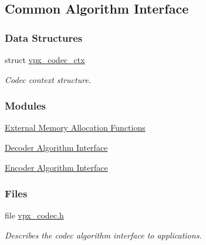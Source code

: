 \hypertarget{group__codec}{
\subsection{\-Common \-Algorithm \-Interface}
\label{group__codec}
}
\subsubsection*{\-Data \-Structures}
\begin{DoxyCompactItemize}
\item 
struct \hyperlink{structvpx__codec__ctx}{vpx\-\_\-codec\-\_\-ctx}
\begin{DoxyCompactList}\small\item\em \-Codec context structure. \end{DoxyCompactList}\end{DoxyCompactItemize}
\subsubsection*{\-Modules}
\begin{DoxyCompactItemize}
\item 
\hyperlink{group__cap__xma}{\-External Memory Allocation Functions}
\item 
\hyperlink{group__decoder}{\-Decoder Algorithm Interface}
\item 
\hyperlink{group__encoder}{\-Encoder Algorithm Interface}
\end{DoxyCompactItemize}
\subsubsection*{\-Files}
\begin{DoxyCompactItemize}
\item 
file \hyperlink{vpx__codec_8h}{vpx\-\_\-codec.\-h}
\begin{DoxyCompactList}\small\item\em \-Describes the codec algorithm interface to applications. \end{DoxyCompactList}\end{DoxyCompactItemize}
